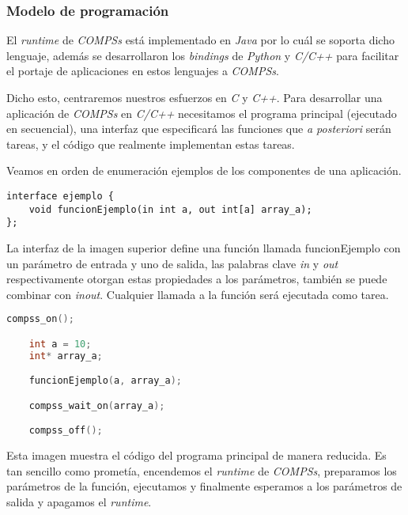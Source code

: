 \subsubsection{Modelo de programación} \label{compss_pm}

El \textit{runtime} de \textit{COMPSs} está implementado en \textit{Java} por lo cuál se soporta dicho lenguaje, además se desarrollaron los \textit{bindings} de \textit{Python}\cite{tejedor2017pycompss} y \textit{C/C++} para facilitar el portaje de aplicaciones en estos lenguajes a \textit{COMPSs}. 
\par\bigskip

Dicho esto, centraremos nuestros esfuerzos en \textit{C} y \textit{C++}. Para desarrollar una aplicación de \textit{COMPSs} en \textit{C/C++} necesitamos el programa principal (ejecutado en secuencial), una interfaz que especificará las funciones que \textit{a posteriori} serán tareas, y el código que realmente implementan estas tareas. 
\par\bigskip

Veamos en orden de enumeración ejemplos de los componentes de una aplicación.

\begin{lstlisting}[caption={Interfaz de la aplicación 'ejemplo'.},captionpos=b, label={lst:ejemplo.idl}, style=idlstyle]
interface ejemplo {
    void funcionEjemplo(in int a, out int[a] array_a);
};
\end{lstlisting}

La interfaz de la imagen superior define una función llamada funcionEjemplo con un parámetro de entrada y uno de salida, las palabras clave \textit{in} y \textit{out} respectivamente otorgan estas propiedades a los parámetros, también se puede combinar con \textit{inout}. Cualquier llamada a la función será ejecutada como tarea.\smallskip

\begin{lstlisting}[caption={Fracción del código del programa principal}, captionpos=b, label={lst:ejemplo.cc}, language=C++]
    compss_on();

    int a = 10;
    int* array_a;

    funcionEjemplo(a, array_a);

    compss_wait_on(array_a);

    compss_off();
\end{lstlisting}

Esta imagen muestra el código del programa principal de manera reducida. Es tan sencillo como prometía, encendemos el \textit{runtime} de \textit{COMPSs}, preparamos los parámetros de la función, ejecutamos y finalmente esperamos a los parámetros de salida y apagamos el \textit{runtime}. \smallskip


